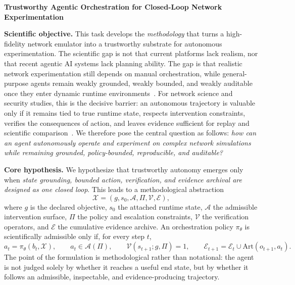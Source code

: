 \documentclass[10pt]{article}
\begin{document}
\small

\begin{center}
{\Large\bfseries Trustworthy Agentic Orchestration for Closed-Loop Network Experimentation}
\end{center}
\vspace{-2mm}

\textbf{Scientific objective.} This task develops the \emph{methodology} that turns a high-fidelity network emulator into a trustworthy substrate for autonomous experimentation. The scientific gap is not that current platforms lack realism, nor that recent agentic AI systems lack planning ability. The gap is that realistic network experimentation still depends on manual orchestration, while general-purpose agents remain weakly grounded, weakly bounded, and weakly auditable once they enter dynamic runtime environments~\cite{yao2023react,lu2024aiscientist,zhu2025safescientist}. For network science and security studies, this is the decisive barrier: an autonomous trajectory is valuable only if it remains tied to true runtime state, respects intervention constraints, verifies the consequences of action, and leaves evidence sufficient for replay and scientific comparison~\cite{yamin2020cyberranges,jiang2021dtn,du2022seed}. We therefore pose the central question as follows: \emph{how can an agent autonomously operate and experiment on complex network simulations while remaining grounded, policy-bounded, reproducible, and auditable?}

\textbf{Core hypothesis.} We hypothesize that trustworthy autonomy emerges only when \emph{state grounding, bounded action, verification, and evidence archival are designed as one closed loop}. This leads to a methodological abstraction
\[
\mathcal{X}=(g,s_0,\mathcal{A},\Pi,\mathcal{V},\mathcal{E}),
\]
where $g$ is the declared objective, $s_0$ the attached runtime state, $\mathcal{A}$ the admissible intervention surface, $\Pi$ the policy and escalation constraints, $\mathcal{V}$ the verification operators, and $\mathcal{E}$ the cumulative evidence archive. An orchestration policy $\pi_\theta$ is scientifically admissible only if, for every step $t$,
\[
a_t=\pi_\theta(b_t,\mathcal{X}),\qquad
a_t\in\mathcal{A}(\Pi),\qquad
\mathcal{V}(s_{t+1};g,\Pi)=1,\qquad
\mathcal{E}_{t+1}=\mathcal{E}_t\cup \mathrm{Art}(o_{t+1},a_t).
\]
The point of the formulation is methodological rather than notational: the agent is not judged solely by whether it reaches a useful end state, but by whether it follows an admissible, inspectable, and evidence-producing trajectory.
\end{document}
